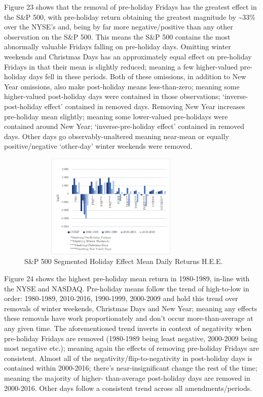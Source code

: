 \documentclass[11pt, english]{article}
\begin{document}
	Figure 23 shows that the removal of pre-holiday Fridays has the greatest effect in the S\&P 500, with pre-holiday return obtaining the greatest magnitude by \~{}33\% over the NYSE’s and, being by far more negative/positive than any other observation on the S\&P 500. This means the S\&P 500 contains the most abnormally valuable Fridays falling on pre-holiday days. Omitting winter weekends and Christmas Days has an approximately equal effect on pre-holiday Fridays in that their mean is slightly reduced; meaning a few higher-valued pre-holiday days fell in these periods. Both of these omissions, in addition to New Year omissions, also make post-holiday means less-than-zero; meaning some higher-valued post-holiday days were contained in those observations; `inverse-post-holiday effect' contained in removed days. Removing New Year increases pre-holiday mean slightly; meaning some lower-valued pre-holidays were contained around New Year; `inverse-pre-holiday effect' contained in removed days. Other days go observably-unaltered meaning near-mean or equally positive/negative `other-day' winter weekends were removed.

	\begin{figure}[H]
        \begin{center}
                \includegraphics[width=9cm,height=5cm]{SP-HE3.png} 
		\caption{S\&P 500 Segmented Holiday Effect Mean Daily Returns H.E.E.}
        \end{center}
        \end{figure}

	Figure 24 shows the highest pre-holiday mean return in 1980-1989, in-line with the NYSE and NASDAQ. Pre-holiday means follow the trend of high-to-low in order: 1980-1989, 2010-2016, 1990-1999, 2000-2009 and hold this trend over removals of winter weekends, Christmas Days and New Year; meaning any effects these removals have work proportionately and don’t occur more-than-average at any given time. The aforementioned trend inverts in context of negativity when pre-holiday Fridays are removed (1980-1989 being least negative, 2000-2009 being most negative etc.); meaning again the effects of removing pre-holiday Fridays are consistent. Almost all of the negativity/flip-to-negativity in post-holiday days is contained within 2000-2016; there’s near-insignificant change the rest of the time; meaning the majority of higher- than-average post-holiday days are removed in 2000-2016. Other days follow a consistent trend across all amendments/periods.
\end{document}
